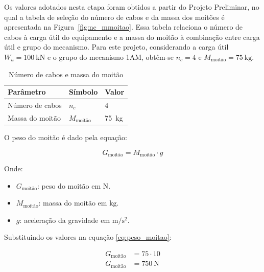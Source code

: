 Os valores adotados nesta etapa foram obtidos a partir do Projeto Preliminar, no qual a tabela de seleção do número de cabos e da massa dos moitões é apresentada na Figura~\ref{fig:nc_mmoitao}. Essa tabela relaciona o número de cabos à carga útil do equipamento e a massa do moitão à combinação entre carga útil e grupo do mecanismo. Para este projeto, considerando a carga útil $W_u = \SI{100}{\kilo\newton}$ e o grupo do mecanismo 1AM, obtêm-se $n_c = 4$ e $M_{\text{moitão}} = \SI{75}{\kilo\gram}$.

\begin{table}[H]
  \centering
  \caption{Número de cabos e massa do moitão}
  \label{tab:nc_mmoitao}
  \begin{tabularx}{\textwidth}{>{\centering\arraybackslash}X>{\centering\arraybackslash}X>{\centering\arraybackslash}X}
    \toprule
    Parâmetro       & Símbolo             & Valor               \\
    \midrule
    Número de cabos & $n_c$               & $4$                 \\
    Massa do moitão & $M_{\text{moitão}}$ & \SI{75}{\kilo\gram} \\
    \bottomrule
  \end{tabularx}
\end{table}

O peso do moitão é dado pela equação:

\begin{equation}
  G_{\text{moitão}} = M_{\text{moitão}} \cdot g
  \label{eq:peso_moitao}
\end{equation}

Onde:

\begin{itemize}[leftmargin=1.25cm]
  \item $G_{\text{moitão}}$: peso do moitão em $\si{\newton}$.
  \item $M_{\text{moitão}}$: massa do moitão em $\si{\kilo\gram}$.
  \item $g$: aceleração da gravidade em $\si{\meter\per\second\squared}$.
\end{itemize}

\vspace{1em}

Substituindo os valores na equação \eqref{eq:peso_moitao}:

\begin{align*}
  G_{\text{moitão}} & = 75 \cdot 10               \\
  G_{\text{moitão}} & = \boxed{\SI{750}{\newton}}
\end{align*}
